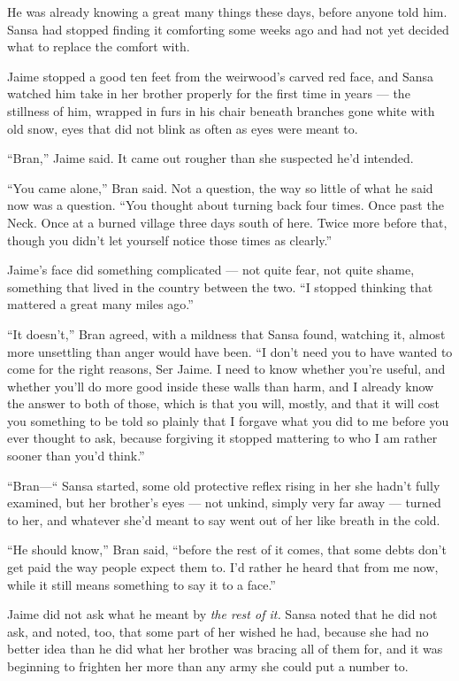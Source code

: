 He was already knowing a great many things these days, before anyone told him. Sansa had stopped finding it comforting some weeks ago and had not yet decided what to replace the comfort with.

Jaime stopped a good ten feet from the weirwood’s carved red face, and Sansa watched him take in her brother properly for the first time in years — the stillness of him, wrapped in furs in his chair beneath branches gone white with old snow, eyes that did not blink as often as eyes were meant to.

“Bran,” Jaime said. It came out rougher than she suspected he’d intended.

“You came alone,” Bran said. Not a question, the way so little of what he said now was a question. “You thought about turning back four times. Once past the Neck. Once at a burned village three days south of here. Twice more before that, though you didn’t let yourself notice those times as clearly.”

Jaime’s face did something complicated — not quite fear, not quite shame, something that lived in the country between the two. “I stopped thinking that mattered a great many miles ago.”

“It doesn’t,” Bran agreed, with a mildness that Sansa found, watching it, almost more unsettling than anger would have been. “I don’t need you to have wanted to come for the right reasons, Ser Jaime. I need to know whether you’re useful, and whether you’ll do more good inside these walls than harm, and I already know the answer to both of those, which is that you will, mostly, and that it will cost you something to be told so plainly that I forgave what you did to me before you ever thought to ask, because forgiving it stopped mattering to who I am rather sooner than you’d think.”

“Bran—“ Sansa started, some old protective reflex rising in her she hadn’t fully examined, but her brother’s eyes — not unkind, simply very far away — turned to her, and whatever she’d meant to say went out of her like breath in the cold.

“He should know,” Bran said, “before the rest of it comes, that some debts don’t get paid the way people expect them to. I’d rather he heard that from me now, while it still means something to say it to a face.”

Jaime did not ask what he meant by \textit{the rest of it.} Sansa noted that he did not ask, and noted, too, that some part of her wished he had, because she had no better idea than he did what her brother was bracing all of them for, and it was beginning to frighten her more than any army she could put a number to.

